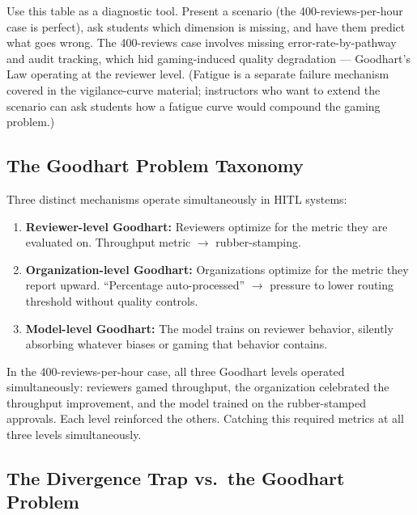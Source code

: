 \begin{technote}
Use this table as a diagnostic tool. Present a scenario (the 400-reviews-per-hour case is perfect), ask students which dimension is missing, and have them predict what goes wrong. The 400-reviews case involves missing error-rate-by-pathway and audit tracking, which hid gaming-induced quality degradation --- Goodhart's Law operating at the reviewer level. (Fatigue is a separate failure mechanism covered in the vigilance-curve material; instructors who want to extend the scenario can ask students how a fatigue curve would compound the gaming problem.)
\end{technote}

\subsection{The Goodhart Problem Taxonomy}

Three distinct mechanisms operate simultaneously in HITL systems:

\begin{enumerate}
    \item \textbf{Reviewer-level Goodhart:} Reviewers optimize for the metric they are evaluated on. Throughput metric $\to$ rubber-stamping.
    \item \textbf{Organization-level Goodhart:} Organizations optimize for the metric they report upward. ``Percentage auto-processed'' $\to$ pressure to lower routing threshold without quality controls.
    \item \textbf{Model-level Goodhart:} The model trains on reviewer behavior, silently absorbing whatever biases or gaming that behavior contains.
\end{enumerate}

\begin{cautionbox}
In the 400-reviews-per-hour case, all three Goodhart levels operated simultaneously: reviewers gamed throughput, the organization celebrated the throughput improvement, and the model trained on the rubber-stamped approvals. Each level reinforced the others. Catching this required metrics at all three levels simultaneously.
\end{cautionbox}

\subsection{The Divergence Trap vs.\ the Goodhart Problem}

